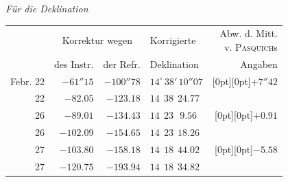 \begin{center}\footnotesize\setlength{\tabcolsep}{4pt}
\emph{Für die Deklination}
\end{center}

\begin{center}\footnotesize\setlength{\tabcolsep}{4pt}
\begin{tabular}{r|r|r|l|r}
 & \multicolumn{2}{c|}{Korrektur wegen} & Korrigierte & \shortstack{Abw. d. Mitt.\\v. \textsc{Pasquich}s}\\
 & des Instr. & der Refr. & Deklination & Angaben \\
\hline
Febr. 22 & $-61''15$ & $-100''78$ & $14^\circ\,38'\,10''07$ & \raisebox{-5.5pt}[0pt][0pt]{$+7''42$} \\
22 & $-82.05$ & $-123.18$ & $14\ \ 38\ \ 24.77$ & \\
26 & $-89.01$ & $-134.43$ & $14\ \ 23\ \ \ 9.56$ & \raisebox{-5.5pt}[0pt][0pt]{$+0.91$} \\
26 & $-102.09$ & $-154.65$ & $14\ \ 23\ \ 18.26$ & \\
27 & $-103.80$ & $-158.18$ & $14\ \ 18\ \ 44.02$ & \raisebox{-5.5pt}[0pt][0pt]{$-5.58$} \\
27 & $-120.75$ & $-193.94$ & $14\ \ 18\ \ 34.82$ & \\
\end{tabular}
\end{center}

